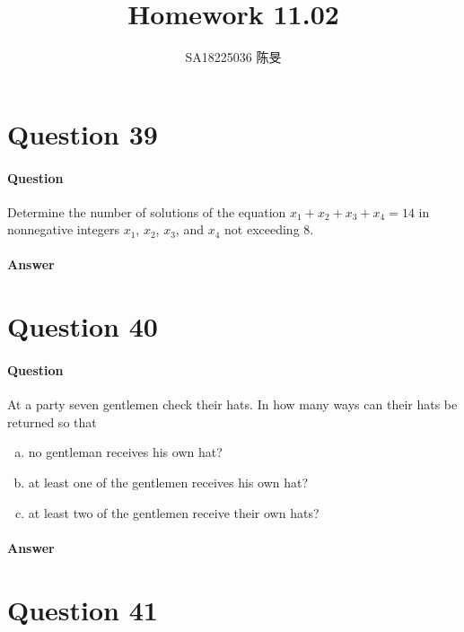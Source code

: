 \documentclass[UTF8]{article}
\title{Homework 11.02}
\author{SA18225036 陈旻}
\date{}
\begin{document}
    \maketitle
    \section{Question 39}
    \paragraph{Question}
    Determine the number of solutions of the equation $ x_{1} + x_{2} + x_{3} + x_{4} = 14 $ in nonnegative integers $ x_{1} $, $ x_{2} $, $ x_{3} $, and $ x_{4} $ not exceeding 8.
    \paragraph{Answer}
    \begin{center}
        
    \end{center}

    \section{Question 40}
    \paragraph{Question}
    At a party seven gentlemen check their hats. In how many ways can their hats be returned so that
    \begin{enumerate}[(a)]
    \item no gentleman receives his own hat?
    \item at least one of the gentlemen receives his own hat?
    \item at least two of the gentlemen receive their own hats?
    \end{enumerate}
    \paragraph{Answer}
    \begin{center}
    \end{center}

    \section{Question 41}
\end{document}
